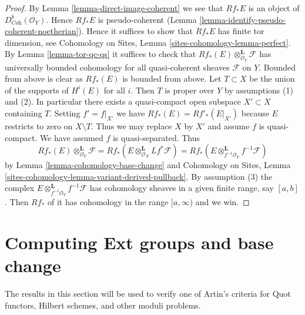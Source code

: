 \begin{proof}
By Lemma \ref{lemma-direct-image-coherent} we see that $Rf_*E$ is an object of
$D^b_{\textit{Coh}}(\mathcal{O}_Y)$. Hence $Rf_*E$ is pseudo-coherent
(Lemma \ref{lemma-identify-pseudo-coherent-noetherian}).
Hence it suffices to show that $Rf_*E$ has finite tor dimension, see
Cohomology on Sites, Lemma \ref{sites-cohomology-lemma-perfect}.
By Lemma \ref{lemma-tor-qc-qs} it suffices to check that
$Rf_*(E) \otimes_{\mathcal{O}_Y}^\mathbf{L} \mathcal{F}$
has universally bounded cohomology for all quasi-coherent
sheaves $\mathcal{F}$ on $Y$. Bounded from above is clear as $Rf_*(E)$
is bounded from above. Let $T \subset X$ be the union of the supports
of $H^i(E)$ for all $i$. Then $T$ is proper over $Y$ by assumptions (1)
and (2). In particular there exists a quasi-compact open subspace
$X' \subset X$ containing $T$. Setting $f' = f|_{X'}$ we have
$Rf_*(E) = Rf'_*(E|_{X'})$ because $E$ restricts to zero on $X \setminus T$.
Thus we may replace $X$ by $X'$ and assume $f$ is quasi-compact.
We have assumed $f$ is quasi-separated. Thus
$$
Rf_*(E) \otimes_{\mathcal{O}_Y}^\mathbf{L} \mathcal{F} =
Rf_*\left(E \otimes_{\mathcal{O}_X}^\mathbf{L} Lf^*\mathcal{F}\right) =
Rf_*\left(E \otimes_{f^{-1}\mathcal{O}_Y}^\mathbf{L} f^{-1}\mathcal{F}\right)
$$
by
Lemma \ref{lemma-cohomology-base-change}
and
Cohomology on Sites, Lemma
\ref{sites-cohomology-lemma-variant-derived-pullback}.
By assumption (3) the complex
$E \otimes_{f^{-1}\mathcal{O}_Y}^\mathbf{L} f^{-1}\mathcal{F}$
has cohomology sheaves in a
given finite range, say $[a, b]$. Then $Rf_*$ of it
has cohomology in the range $[a, \infty)$ and we win.
\end{proof}






\section{Computing Ext groups and base change}
\label{section-ext}

\noindent
The results in this section will be used to verify one of Artin's criteria
for Quot functors, Hilbert schemes, and other moduli problems.

